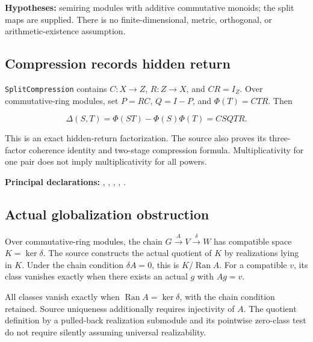 \documentclass[11pt]{article}
\begin{document}
\textbf{Hypotheses:} semiring modules with additive commutative monoids;
the split maps are supplied. There is no finite-dimensional, metric,
orthogonal, or arithmetic-existence assumption.

\hypertarget{compression-records-hidden-return}{%
\subsection{Compression records hidden
return}\label{compression-records-hidden-return}}

\texttt{SplitCompression} contains \(C:X\to Z\),
\(R:Z\to X\), and \(CR=I_Z\). Over commutative-ring modules, set
\(P=RC\), \(Q=I-P\), and \(\Phi(T)=CTR\). Then

\[
\Delta(S,T)=\Phi(ST)-\Phi(S)\Phi(T)=CSQTR.
\]

This is an exact hidden-return factorization. The source also proves its
three-factor coherence identity and two-stage compression formula.
Multiplicativity for one pair does not imply multiplicativity for all
powers.

\textbf{Principal declarations:}
\texttt{},
\texttt{},
\texttt{},
\texttt{},
\texttt{}.

\hypertarget{actual-globalization-obstruction}{%
\subsection{Actual globalization
obstruction}\label{actual-globalization-obstruction}}

Over commutative-ring modules, the chain
\(G\xrightarrow{A}V\xrightarrow{\delta}W\) has compatible space
\(K=\ker\delta\). The source constructs the actual quotient of \(K\) by
realizations lying in \(K\). Under the chain condition \(\delta A=0\),
this is \(K/\operatorname{Ran}A\). For a compatible \(v\), its class
vanishes exactly when there exists an actual \(g\) with \(Ag=v\).

All classes vanish exactly when \(\operatorname{Ran}A=\ker\delta\), with
the chain condition retained. Source uniqueness additionally requires
injectivity of \(A\). The quotient definition by a pulled-back
realization submodule and its pointwise zero-class test do not require
silently assuming universal realizability.
\end{document}
